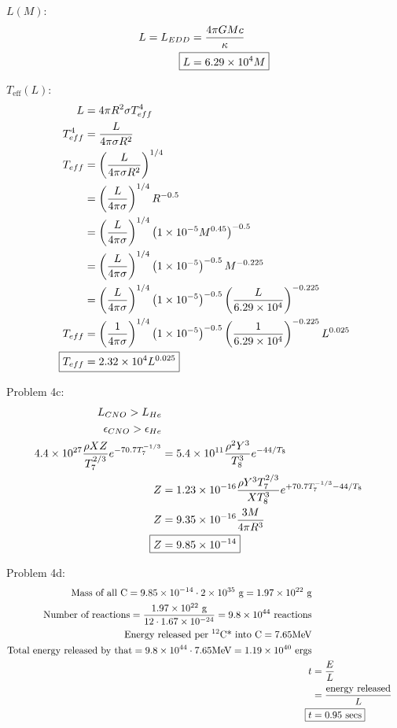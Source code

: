 \documentclass[10pt,letter,preprint]{aastex}
\newcommand{\rp}{\right)}
\newcommand{\lp}{\left(}
\begin{document}
$L(M)$:
\begin{align}
L = L_{EDD} &= \frac{4 \pi GMc}{\kappa}\\
\Aboxed{L &= 6.29\times 10^4 M}
\end{align}

$T_{\textrm{eff}}(L)$:
\begin{align}
L &= 4 \pi R^2 \sigma T_{eff}^4\\
T_{eff}^4 &= \frac{L}{4 \pi \sigma R^2}\\
T_{eff} &= \lp \frac{L}{4 \pi \sigma R^2} \rp^{1/4}\\
&= \lp \frac{L}{4 \pi \sigma} \rp^{1/4} R^{-0.5}\\
&= \lp \frac{L}{4 \pi \sigma} \rp^{1/4}  \lp1 \times 10^{-5} M^{0.45}\rp^{-0.5}\\
&= \lp \frac{L}{4 \pi \sigma} \rp^{1/4}  \lp1 \times 10^{-5} \rp^{-0.5}M^{-0.225}\\
&= \lp \frac{L}{4 \pi \sigma} \rp^{1/4}  \lp1 \times 10^{-5} \rp^{-0.5} \lp \frac{L}{6.29 \times 10^4}\rp^{-0.225}\\
T_{eff} &= \lp \frac{1}{4 \pi \sigma } \rp^{1/4}  \lp1 \times 10^{-5} \rp^{-0.5} \lp \frac{1}{6.29 \times 10^4}\rp^{-0.225} L^{0.025}\\
\Aboxed{T_{eff} &= 2.32 \times 10^4 L^{0.025}}
\end{align}

Problem 4c:\\
\begin{align}
L_{CNO} > L_{He}\\
\epsilon_{CNO} > \epsilon_{He}\\
4.4 \times 10^{27}\frac{\rho XZ}{T_7^{2/3}} e^{-70.7T_7^{-1/3}}&= 5.4 \times 10^{11}\frac{\rho^2 Y^3}{T_8^3}e^{-44/T_8}\\
Z&= 1.23 \times 10^{-16}\frac{\rho Y^3 T_7^{2/3}}{XT_8^3} e^{+70.7T_7^{-1/3} - 44/T_8}\\
Z&= 9.35 \times 10^{-16}\frac{3M}{4 \pi R^3}\\
\Aboxed{Z&=9.85 \times 10^{-14}}
\end{align}

\newpage
Problem 4d:\\
\begin{align}
\textrm{Mass of all C}=9.85 \times 10^{-14} \cdot 2\times 10^{35} \textrm{ g}=1.97 \times 10^{22} \textrm{ g}\\
\textrm{Number of reactions} = \frac{1.97 \times 10^{22} \textrm{ g}}{12 \cdot 1.67 \times 10^{-24}} =9.8 \times 10^{44} \textrm{ reactions}\\
\textrm{Energy released per $^{12}$C* into C} = 7.65\textrm{MeV}\\
\textrm{Total energy released by that} = 9.8 \times 10^{44} \cdot 7.65\textrm{MeV} = 1.19\times 10^{40} \textrm{ ergs}\\
t &= \frac{E}{L}\\
&= \frac{\textrm{energy released}}{L}\\
\Aboxed{ t &= 0.95 \textrm{ secs}}
\end{align}
\end{document}
